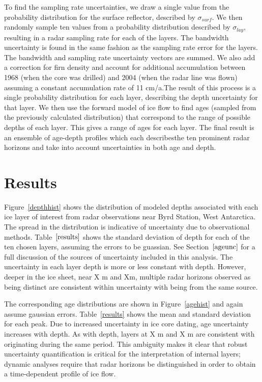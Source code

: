 \documentclass[draft,jgrga]{agutex}
\begin{document}
\begin{article}
To find the sampling rate uncertainties, we draw a single value from the probability distribution for the surface reflector, described by $\sigma_{surf}$. We then randomly sample ten values from a probability distribution described by $\sigma_{lay}$, resulting in a radar sampling rate for each of the layers. The bandwidth uncertainty is found in the same fashion as the sampling rate error for the layers. The bandwidth and sampling rate uncertainty vectors are summed.  We also add a correction for firn density and account for additional accumulation between 1968 (when the core was drilled) and 2004 (when the radar line was flown) assuming a constant accumulation rate of 11 cm/a.The result of this process is a single probability distribution for each layer, describing the depth uncertainty for that layer. We then use the forward model of ice flow to find ages (sampled from the previously calculated distribution) that correspond to the range of possible depths of each layer. This gives a range of ages for each layer. The final result is an ensemble of age-depth profiles which each describesthe ten prominent radar horizons and take into account uncertainties in both age and depth.






\section{Results}




Figure~\ref{depthhist} shows the distribution of modeled depths associated with each ice layer of interest from radar observations near Byrd Station, West Antarctica. The spread in the distribution is indicative of uncertainty due to observational methods. Table~$\ref{results}$ shows the standard deviation of depth for each of the ten chosen layers, assuming the errors to be guassian. See Section~$\ref{ageunc}$ for a full discussion of the sources of uncertainty included in this analysis. The uncertainty in each layer depth is more or less constant with depth. However, deeper in the ice sheet, near X m and Xm,  multiple radar horizons observed as being distinct are consistent within uncertainty with being from the same source. 

The corresponding age distributions are shown in Figure~\ref{agehist} and again assume gaussian errors. Table~\ref{results} shows the mean and standard deviation for each peak. Due to increased uncertainty in ice core dating, age uncertainty increases with depth. As with depth, layers at X m and X m are consistent with originating during the same period. This ambiguity makes it clear that robust uncertainty quantification is critical for the interpretation of internal layers; dynamic analyses require that radar horizons be distinguished in order to obtain a time-dependent profile of ice flow. 


\end{article}
\end{document}
